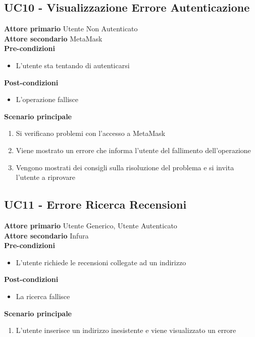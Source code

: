 \subsection{UC10 - Visualizzazione Errore Autenticazione}
\label{UC10}
\textbf{Attore primario} Utente Non Autenticato \\
\textbf{Attore secondario} MetaMask \\
\textbf{Pre-condizioni}
\begin{itemize}
    \item L'utente sta tentando di autenticarsi
\end{itemize}
\textbf{Post-condizioni}
\begin{itemize}
    \item L'operazione fallisce
\end{itemize}
\textbf{Scenario principale}
\begin{enumerate}
    \item Si verificano problemi con l'accesso a MetaMask
    \item Viene mostrato un errore che informa l'utente del fallimento dell'operazione
    \item Vengono mostrati dei consigli sulla risoluzione del problema e si invita
          l'utente a riprovare
\end{enumerate}

\subsection{UC11 - Errore Ricerca Recensioni}
\label{UC11}
\textbf{Attore primario} Utente Generico, Utente Autenticato \\
\textbf{Attore secondario} Infura \\
\textbf{Pre-condizioni}
\begin{itemize}
    \item L'utente richiede le recensioni collegate ad un indirizzo
\end{itemize}
\textbf{Post-condizioni}
\begin{itemize}
    \item La ricerca fallisce
\end{itemize}
\textbf{Scenario principale}
\begin{enumerate}
    \item L'utente inserisce un indirizzo inesistente e viene visualizzato un errore
\end{enumerate}

